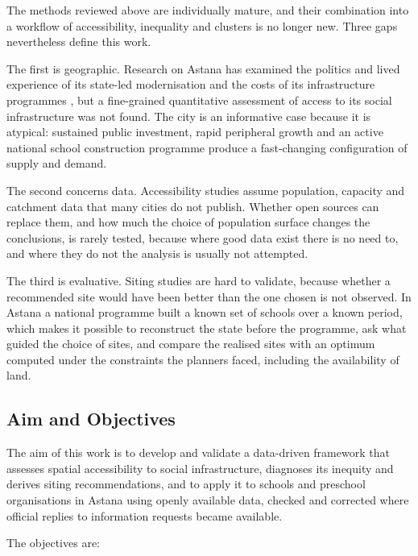 The methods reviewed above are individually mature, and their combination into a workflow of accessibility, inequality and clusters is no longer new. Three gaps nevertheless define this work.

The first is geographic. Research on Astana has examined the politics and lived experience of its state-led modernisation \cite{koch2014} and the costs of its infrastructure programmes \cite{astana2025}, but a fine-grained quantitative assessment of access to its social infrastructure was not found. The city is an informative case because it is atypical: sustained public investment, rapid peripheral growth and an active national school construction programme produce a fast-changing configuration of supply and demand.

The second concerns data. Accessibility studies assume population, capacity and catchment data that many cities do not publish. Whether open sources can replace them, and how much the choice of population surface changes the conclusions, is rarely tested, because where good data exist there is no need to, and where they do not the analysis is usually not attempted.

The third is evaluative. Siting studies are hard to validate, because whether a recommended site would have been better than the one chosen is not observed. In Astana a national programme built a known set of schools over a known period, which makes it possible to reconstruct the state before the programme, ask what guided the choice of sites, and compare the realised sites with an optimum computed under the constraints the planners faced, including the availability of land.

\subsection{Aim and Objectives}

The aim of this work is to develop and validate a data-driven framework that assesses spatial accessibility to social infrastructure, diagnoses its inequity and derives siting recommendations, and to apply it to schools and preschool organisations in Astana using openly available data, checked and corrected where official replies to information requests became available.

The objectives are:

